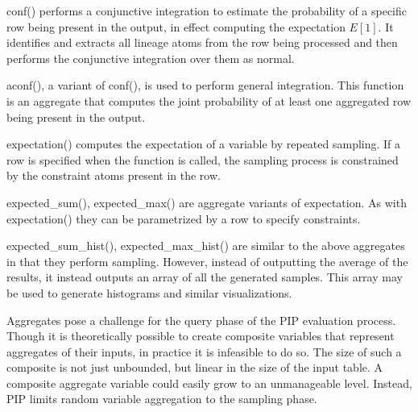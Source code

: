 conf() performs a conjunctive integration to estimate the probability of a specific row being present in the output, in effect computing the expectation $E[1]$.  It identifies and extracts all lineage atoms from the row being processed and then performs the conjunctive integration over them as normal.

aconf(), a variant of conf(), is used to perform general integration.  This function is an aggregate that computes the joint probability of at least one aggregated row being present in the output.  

expectation() computes the expectation of a variable by repeated sampling.  If a row is specified when the function is called, the sampling process is constrained by the constraint atoms present in the row.

expected\_sum(), expected\_max() are aggregate variants of expectation.  As with expectation() they can be parametrized by a row to specify constraints.

expected\_sum\_hist(), expected\_max\_hist() are similar to the above aggregates in that they perform sampling.  However, instead of outputting the average of the results, it instead outputs an array of all the generated samples.  This array may be used to generate histograms and similar visualizations.

Aggregates pose a challenge for the query phase of the PIP evaluation process.  Though it is theoretically possible to create composite variables that represent aggregates of their inputs, in practice it is infeasible to do so.  The size of such a composite is not just unbounded, but linear in the size of the input table.  A composite aggregate variable could easily grow to an unmanageable level.  Instead, PIP limits random variable aggregation to the sampling phase.  


